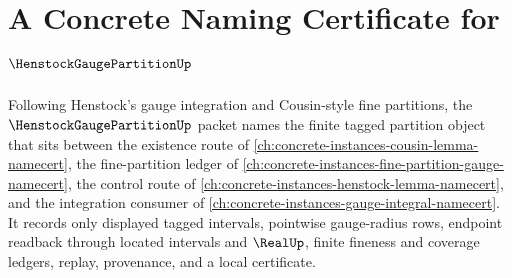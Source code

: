 \chapter{A Concrete Naming Certificate for $\HenstockGaugePartitionUp$}
\label{ch:concrete-instances-henstock-gauge-partition-namecert}

Following Henstock's gauge integration and Cousin-style fine partitions, the $\HenstockGaugePartitionUp$ packet names the finite tagged partition object that sits between the existence route of \autoref{ch:concrete-instances-cousin-lemma-namecert}, the fine-partition ledger of \autoref{ch:concrete-instances-fine-partition-gauge-namecert}, the control route of \autoref{ch:concrete-instances-henstock-lemma-namecert}, and the integration consumer of \autoref{ch:concrete-instances-gauge-integral-namecert}. It records only displayed tagged intervals, pointwise gauge-radius rows, endpoint readback through located intervals and $\RealUp$, finite fineness and coverage ledgers, replay, provenance, and a local certificate.

